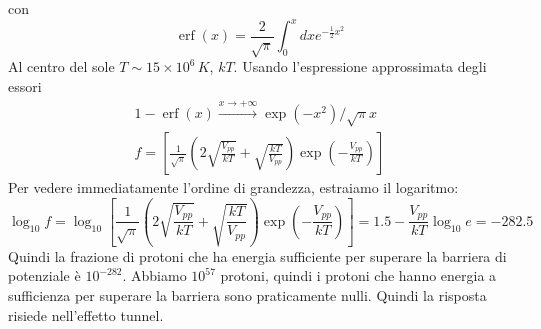 con 
\begin{equation*}
\operatorname{erf}(x)=\frac{2}{\sqrt{\pi}} \int_0^x d x e^{-\frac{1}{2} x^2}
\end{equation*}
Al centro del sole $T\sim15\times 10^{6}\,K$, $kT$. Usando l'espressione approssimata degli essori 
\begin{align*}
    1-\operatorname{erf}(x) \stackrel{x \rightarrow+\infty}{\longrightarrow} \exp \left(-x^2\right) / \sqrt{\pi} x \\ f=\left[\frac{1}{\sqrt{\pi}}\left(2 \sqrt{\frac{V_{p p}}{k T}}+\sqrt{\frac{k T}{V_{p p}}}\right) \exp \left(-\frac{V_{p p}}{k T}\right)\right]
\end{align*} 
Per vedere immediatamente l'ordine di grandezza, estraiamo il logaritmo:
\begin{equation*}
  \log _{10} f=\log _{10}\left[\frac{1}{\sqrt{\pi}}\left(2 \sqrt{\frac{V_{p p}}{k T}}+\sqrt{\frac{k T}{V_{p p}}}\right) \exp \left(-\frac{V_{p p}}{k T}\right)\right]=1.5-\frac{V_{p p}}{k T} \log _{10} e=-282.5
\end{equation*}
Quindi la frazione di protoni che ha energia sufficiente per superare la barriera di potenziale è $10^{-282}$. Abbiamo $10^{57}$ protoni, quindi i protoni che hanno energia a sufficienza per superare la barriera sono praticamente nulli. Quindi la risposta risiede nell'effetto tunnel.
